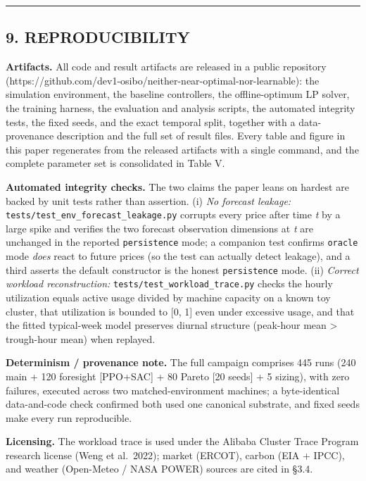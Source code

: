 \documentclass[
  11pt,
]{article}
\begin{document}
\begin{center}\rule{0.5\linewidth}{0.5pt}\end{center}

\subsection{9. REPRODUCIBILITY}\label{reproducibility}

\textbf{Artifacts.} All code and result artifacts are released in a
public repository
(https://github.com/dev1-osibo/neither-near-optimal-nor-learnable): the
simulation environment, the baseline controllers, the offline-optimum LP
solver, the training harness, the evaluation and analysis scripts, the
automated integrity tests, the fixed seeds, and the exact temporal
split, together with a data-provenance description and the full set of
result files. Every table and figure in this paper regenerates from the
released artifacts with a single command, and the complete parameter set
is consolidated in Table V.

\textbf{Automated integrity checks.} The two claims the paper leans on
hardest are backed by unit tests rather than assertion. (i) \emph{No
forecast leakage:} \texttt{tests/test\_env\_forecast\_leakage.py}
corrupts every price after time \emph{t} by a large spike and verifies
the two forecast observation dimensions at \emph{t} are unchanged in the
reported \texttt{persistence} mode; a companion test confirms
\texttt{oracle} mode \emph{does} react to future prices (so the test can
actually detect leakage), and a third asserts the default constructor is
the honest \texttt{persistence} mode. (ii) \emph{Correct workload
reconstruction:} \texttt{tests/test\_workload\_trace.py} checks the
hourly utilization equals active usage divided by machine capacity on a
known toy cluster, that utilization is bounded to {[}0, 1{]} even under
excessive usage, and that the fitted typical-week model preserves
diurnal structure (peak-hour mean \textgreater{} trough-hour mean) when
replayed.

\textbf{Determinism / provenance note.} The full campaign comprises 445
runs (240 main + 120 foresight {[}PPO+SAC{]} + 80 Pareto {[}20 seeds{]}
+ 5 sizing), with zero failures, executed across two matched-environment
machines; a byte-identical data-and-code check confirmed both used one
canonical substrate, and fixed seeds make every run reproducible.

\textbf{Licensing.} The workload trace is used under the Alibaba Cluster
Trace Program research license (Weng et al.~2022); market (ERCOT),
carbon (EIA + IPCC), and weather (Open-Meteo / NASA POWER) sources are
cited in §3.4.
\end{document}
